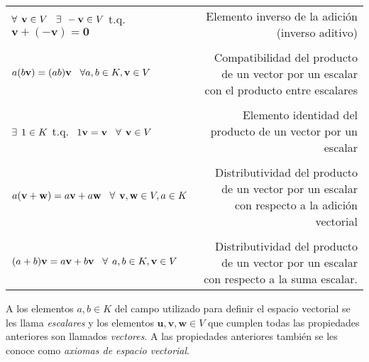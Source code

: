\documentclass[apuntes]{subfiles}
\begin{document}
\begin{tcolorbox}
\begin{center}
\begin{tabular}{lr}
    $\forall\hspace{1.5mm}\mathbf{v}\in V \hspace{3mm}\exists\hspace{1.5mm} -\mathbf{v}\in V$ t.q. $\mathbf{v}+(-\mathbf{v})=\mathbf{0}$ & Elemento inverso de la adición (inverso aditivo) \\ \\
    \multirow{2}{0.35\textwidth}{$a(b\mathbf{v})=(ab)\mathbf{v}\hspace{3mm}\forall a,b\in K, \mathbf{v}\in V$} & \multirow{2}{0.47\textwidth}{Compatibilidad del producto de un vector por un escalar con el producto entre escalares} \\ \\ \\
    \multirow{2}{0.4\textwidth}{$\exists\hspace{1.5mm}1\in K$ \hspace{1.5mm} t.q. $\hspace{1.5mm}1\mathbf{v}=\mathbf{v}\hspace{3mm}\forall\hspace{1.5mm} \mathbf{v}\in V$} & \multirow{2}{0.35\textwidth}{Elemento identidad del producto de un vector por un escalar} \\ \\ \\
    \multirow{2}{0.4\textwidth}{$a(\mathbf{v}+\mathbf{w})=a\mathbf{v}+a\mathbf{w}\hspace{3mm}\forall\hspace{1.5mm} \mathbf{v},\mathbf{w}\in V, a\in K$} & \multirow{2}{0.47\textwidth}{Distributividad del producto de un vector por un escalar con respecto a la adición vectorial}  \\ \\ \\
    \multirow{2}{0.4\textwidth}{$(a+b)\mathbf{v}=a\mathbf{v}+b\mathbf{v}\hspace{3mm}\forall\hspace{1.5mm} a,b\in K, \mathbf{v}\in V$} & \multirow{2}{0.47\textwidth}{Distributividad del producto de un vector por un escalar con respecto a la suma escalar.} \\ \\
\end{tabular}
\end{center}

\hspace{2.5mm} A los elementos $a,b \in K$ del campo utilizado para definir el espacio vectorial se les llama \textit{escalares} y los elementos $\mathbf{u},\mathbf{v},\mathbf{w}\in V$ que cumplen todas las propiedades anteriores son llamados \textit{vectores}. A las propiedades anteriores también se les conoce como \textit{axiomas de espacio vectorial}.

\end{tcolorbox}
\end{document}
